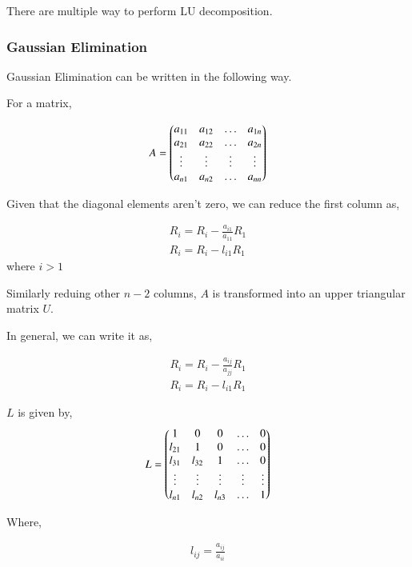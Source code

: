 \documentclass[journal]{IEEEtran}
\begin{document}
There are multiple way to perform LU decomposition.

\subsubsection{Gaussian Elimination}

    Gaussian Elimination can be written in the following way.

    For a matrix,

    \begin{align}
        A = \begin{pmatrix}a_{11} & a_{12} & \dots & a_{1n}\\a_{21} & a_{22} & \dots & a_{2n}\\\vdots & \vdots & \vdots & \vdots\\a_{n1} & a_{n2} & \dots & a_{nn}\end{pmatrix}
    \end{align}

    Given that the diagonal elements aren't zero, we can reduce the first column as,

    \begin{align}
        R_i = R_i - \frac{a_{i1}}{a_{11}}R_1\\
        R_i = R_i - l_{i1}R_1
    \end{align}
    where $i>1$

    Similarly reduing other $n-2$ columns, $A$ is transformed into an upper triangular matrix $U$.

    In general, we can write it as,

    \begin{align}
        R_i = R_i - \frac{a_{ij}}{a_{jj}}R_1\\
        R_i = R_i - l_{i1}R_1
    \end{align}

    $L$ is given by,
    \begin{align}
        L = \begin{pmatrix}1 & 0 & 0 & \dots & 0\\l_{21} & 1 & 0 & \dots & 0\\ l_{31} & l_{32} & 1 & \dots & 0\\
        \vdots & \vdots & \vdots & \vdots & \vdots\\l_{n1} & l_{n2} & l_{n3} & \dots & 1\end{pmatrix}
    \end{align}

    Where,

    \begin{align}
        l_{ij} = \frac{a_{ij}}{a_{ii}}
    \end{align}
\end{document}

